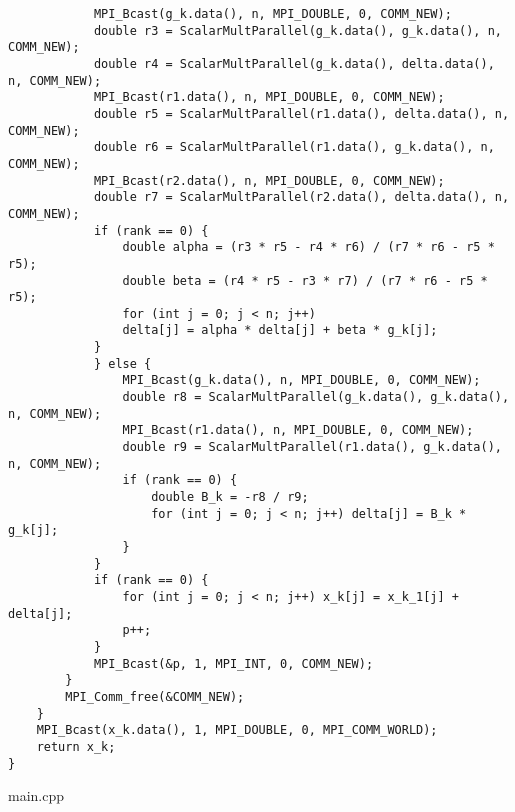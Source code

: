 \documentclass{report}
\begin{document}
\begin{lstlisting}
			MPI_Bcast(g_k.data(), n, MPI_DOUBLE, 0, COMM_NEW);
			double r3 = ScalarMultParallel(g_k.data(), g_k.data(), n, COMM_NEW);
			double r4 = ScalarMultParallel(g_k.data(), delta.data(), n, COMM_NEW);
			MPI_Bcast(r1.data(), n, MPI_DOUBLE, 0, COMM_NEW);
			double r5 = ScalarMultParallel(r1.data(), delta.data(), n, COMM_NEW);
			double r6 = ScalarMultParallel(r1.data(), g_k.data(), n, COMM_NEW);
			MPI_Bcast(r2.data(), n, MPI_DOUBLE, 0, COMM_NEW);
			double r7 = ScalarMultParallel(r2.data(), delta.data(), n, COMM_NEW);
			if (rank == 0) {
				double alpha = (r3 * r5 - r4 * r6) / (r7 * r6 - r5 * r5);
				double beta = (r4 * r5 - r3 * r7) / (r7 * r6 - r5 * r5);
				for (int j = 0; j < n; j++)
				delta[j] = alpha * delta[j] + beta * g_k[j];
			}
			} else {
				MPI_Bcast(g_k.data(), n, MPI_DOUBLE, 0, COMM_NEW);
				double r8 = ScalarMultParallel(g_k.data(), g_k.data(), n, COMM_NEW);
				MPI_Bcast(r1.data(), n, MPI_DOUBLE, 0, COMM_NEW);
				double r9 = ScalarMultParallel(r1.data(), g_k.data(), n, COMM_NEW);
				if (rank == 0) {
					double B_k = -r8 / r9;
					for (int j = 0; j < n; j++) delta[j] = B_k * g_k[j];
				}
			}
			if (rank == 0) {
				for (int j = 0; j < n; j++) x_k[j] = x_k_1[j] + delta[j];
				p++;
			}
			MPI_Bcast(&p, 1, MPI_INT, 0, COMM_NEW);
		}
		MPI_Comm_free(&COMM_NEW);
	}
	MPI_Bcast(x_k.data(), 1, MPI_DOUBLE, 0, MPI_COMM_WORLD);
	return x_k;
}
\end{lstlisting}
main.cpp
\end{document}
